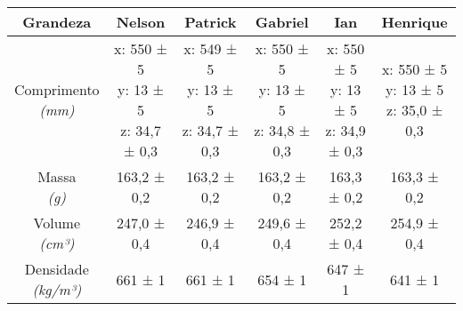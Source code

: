 \documentclass{article}
\begin{document}
\begin{table}[h!]
\centering
\begin{tabular}{c c c c c c }
\toprule
Grandeza & Nelson & Patrick & Gabriel & Ian & Henrique\\
\midrule
\shortstack{Comprimento\\\textit{(mm)}} & \shortstack{x: 550 ± 5\\y: 13 ± 5\\z: 34,7 ± 0,3} & \shortstack{x: 549 ± 5\\y: 13 ± 5\\z: 34,7 ± 0,3} & \shortstack{x: 550 ± 5\\y: 13 ± 5\\z: 34,8 ± 0,3} & \shortstack{x: 550 ± 5\\y: 13 ± 5\\z: 34,9 ± 0,3} & \shortstack{x: 550 ± 5\\y: 13 ± 5\\z: 35,0 ± 0,3}\\[4pt]
\shortstack{Massa\\\textit{(g)}} & 163,2 ± 0,2 & 163,2 ± 0,2 & 163,2 ± 0,2 & 163,3 ± 0,2 & 163,3 ± 0,2\\[4pt]
\shortstack{Volume\\\textit{(cm³)}} & 247,0 ± 0,4 & 246,9 ± 0,4 & 249,6 ± 0,4 & 252,2 ± 0,4 & 254,9 ± 0,4\\[4pt]
\shortstack{Densidade\\\textit{(kg/m³)}} & 661 ± 1 & 661 ± 1 & 654 ± 1 & 647 ± 1 & 641 ± 1\\[4pt]
\bottomrule
\end{tabular}
\end{table}
\end{document}
